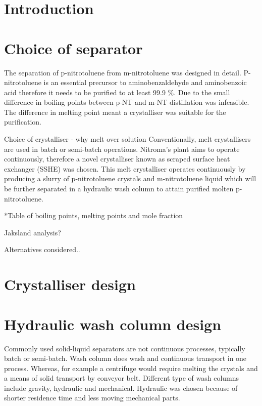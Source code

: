 \section{Introduction}


\section{Choice of separator}
The separation of p-nitrotoluene from m-nitrotoluene was designed in detail. P-nitrotoluene is an essential precursor to aminobenzaldehyde and aminobenzoic acid therefore it needs to be purified to at least 99.9 \%. Due to the small difference in boiling points between p-NT and m-NT distillation was infeasible. The difference in melting point meant a crystalliser was suitable for the purification.

Choice of crystalliser 
- why melt over solution 
Conventionally, melt crystallisers are used in batch or semi-batch operations. Nitroma’s plant aims to operate continuously, therefore a novel crystalliser known as scraped surface heat exchanger (SSHE) was chosen. This melt crystalliser operates continuously by producing a slurry of p-nitrotoluene crystals and m-nitrotoluene liquid which will be further separated in a hydraulic wash column to attain purified molten p-nitrotoluene. 

 *Table of boiling points, melting points and mole fraction 
 
Jaksland analysis?

Alternatives considered..

\begin{comment}
were MSMPR crystallisers that operate continuously. However, these crystallisers are primarily used for solvent crystallisation. The mode of crystallisation at Nitroma will be melt crystallisation to avoid the issue of handling solvents. 
\end{comment}


\section{Crystalliser design}




\section{Hydraulic wash column design}

Commonly used solid-liquid separators are not continuous processes, typically batch or semi-batch. Wash column does wash and continuous transport in one process. Whereas, for example a centrifuge would require  melting the crystals and a means of solid transport by conveyor belt. Different type of wash columns include gravity, hydraulic and mechanical. Hydraulic was chosen because of shorter residence time and less moving mechanical parts. 

